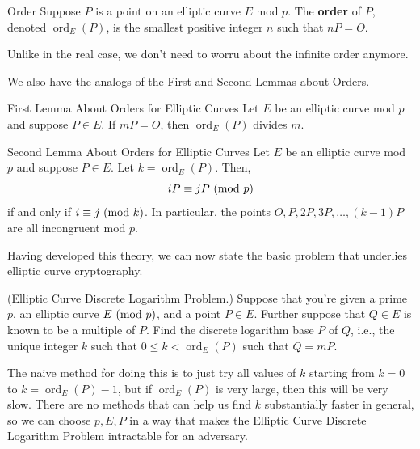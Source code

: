 \documentclass[letterpaper]{article}
\DeclareMathOperator{\ord}{ord}
\begin{document}
\begin{definition}{Order}{}
    Suppose $P$ is a point on an elliptic curve $E$ mod $p$. The \textbf{order} of $P$, denoted $\ord_{E}(P)$, is the smallest positive integer $n$ such that $nP = O$. 
\end{definition}
Unlike in the real case, we don't need to worru about the infinite order anymore. 

\bigskip 

We also have the analogs of the First and Second Lemmas about Orders. 
\begin{lemma}{First Lemma About Orders for Elliptic Curves}{}
    Let $E$ be an elliptic curve mod $p$ and suppose $P \in E$. If $mP = O$, then $\ord_{E}(P)$ divides $m$. 
\end{lemma}

\begin{lemma}{Second Lemma About Orders for Elliptic Curves}{}
    Let $E$ be an elliptic curve mod $p$ and suppose $P \in E$. Let $k = \ord_{E}(P)$. Then, \[iP \equiv jP \ (\mathrm{mod}\ p)\] if and only if $i \equiv j \ (\mathrm{mod}\ k)$. In particular, the points $O, P, 2P, 3P, \hdots, (k - 1)P$ are all incongruent mod $p$.
\end{lemma}
Having developed this theory, we can now state the basic problem that underlies elliptic curve cryptography. 
\begin{mdframed}
    (Elliptic Curve Discrete Logarithm Problem.) Suppose that you're given a prime $p$, an elliptic curve $E \ (\mathrm{mod}\ p)$, and a point $P \in E$. Further suppose that $Q \in E$ is known to be a multiple of $P$. Find the discrete logarithm base $P$ of $Q$, i.e., the unique integer $k$ such that $0 \leq k < \ord_{E}(P)$ such that $Q = mP$. 
\end{mdframed}
The naive method for doing this is to just try all values of $k$ starting from $k = 0$ to $k = \ord_{E}(P) - 1$, but if $\ord_{E}(P)$ is very large, then this will be very slow. There are no methods that can help us find $k$ substantially faster in general, so we can choose $p, E, P$ in a way that makes the Elliptic Curve Discrete Logarithm Problem intractable for an adversary. 
\end{document}
